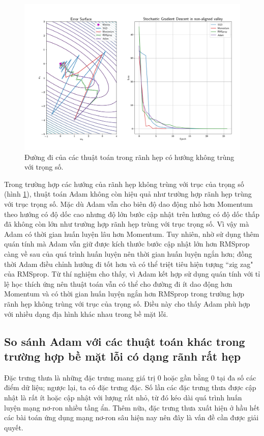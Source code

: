 \begin{figure}[htp]
	\centering
	\includegraphics[width=100 mm]{images/nonaligned.png}
	\caption{Đường đi của các thuật toán trong rãnh hẹp có hướng không trùng với trọng số.}
	\label{fig:nonaligned}
\end{figure}

Trong trường hợp các hướng của rãnh hẹp không trùng với trục của trọng số (hình \ref{fig:nonaligned}), thuật toán Adam không còn hiệu quả như trường hợp rãnh hẹp trùng với trục trọng số. Mặc dù Adam vẫn cho biên độ dao động nhỏ hơn Momentum theo hướng có độ dốc cao nhưng độ lớn bước cập nhật trên hướng có độ dốc thấp đã không còn lớn như trường hợp rãnh hẹp trùng với trục trọng số. Vì vậy mà Adam có thời gian huấn luyện lâu hơn Momentum. Tuy nhiên, nhờ sử dụng thêm quán tính mà Adam vẫn giữ được kích thước bước cập nhật lớn hơn RMSprop càng về sau của quá trình huấn luyện nên thời gian huấn luyện ngắn hơn; đồng thời Adam điều chỉnh hướng đi tốt hơn và có thể triệt tiêu hiện tượng ``zig zag" của RMSprop. Từ thí nghiệm cho thấy, vì Adam kết hợp sử dụng quán tính với tỉ lệ học thích ứng nên thuật toán vẫn có thể cho đường đi ít dao động hơn Momentum và có thời gian huấn luyện ngắn hơn RMSprop trong trường hợp rãnh hẹp không trùng với trục của trọng số. Điều này cho thấy Adam phù hợp với nhiều dạng địa hình khác nhau trong bề mặt lỗi.

\subsection{So sánh Adam với các thuật toán khác trong trường hợp bề mặt lỗi có dạng rãnh rất hẹp}
\label{exp:sparse-noisy}

Đặc trưng thưa là những đặc trưng mang giá trị 0 hoặc gần bằng 0 tại đa số các điểm dữ liệu; ngược lại, ta có đặc trưng đặc. Số lần các đặc trưng thưa được cập nhật là rất ít hoặc cập nhật với lượng rất nhỏ, từ đó kéo dài quá trình huấn luyện mạng nơ-ron nhiều tầng ẩn. Thêm nữa, đặc trưng thưa xuất hiện ở hầu hết các bài toán ứng dụng mạng nơ-ron sâu hiện nay nên đây là vấn đề cần được giải quyết.

